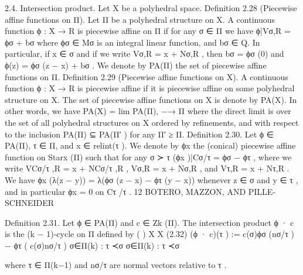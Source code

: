 \documentclass[
  11pt,
]{article}
\newenvironment{Shaded}{}{}
\newcommand{\NormalTok}[1]{#1}
\begin{document}
\begin{Shaded}
\begin{Highlighting}[]
\NormalTok{2.4. Intersection product. Let X be a polyhedral space.}
\NormalTok{Definition 2.28 (Piecewise affine functions on Π). Let Π be a polyhedral structure on X. A}
\NormalTok{continuous function ϕ : X → R is piecewise affine on Π if for any σ ∈ Π we have}
\NormalTok{                                           ϕ|Vσ,R = ϕσ + bσ}
\NormalTok{where ϕσ ∈ Mσ is an integral linear function, and bσ ∈ Q. In particular, if x ∈ σ and if we write}
\NormalTok{Vσ,R = x + Nσ,R , then bσ = ϕσ (0) and ϕ(z) = ϕσ (z − x) + bσ .}
\NormalTok{   We denote by PA(Π) the set of piecewise affine functions on Π.}
\NormalTok{Definition 2.29 (Piecewise affine functions on X). A continuous function ϕ : X → R is}
\NormalTok{piecewise affine if it is piecewise affine on some polyhedral structure on X. The set of piecewise}
\NormalTok{affine functions on X is denote by PA(X). In other words, we have}
\NormalTok{                                        PA(X) = lim PA(Π),}
\NormalTok{                                                −→}
\NormalTok{                                                   Π}
\NormalTok{where the direct limit is over the set of all polyhedral structures on X ordered by refinements, and}
\NormalTok{with respect to the inclusion PA(Π) ⊆ PA(Π′ ) for any Π′ ≥ Π.}
\NormalTok{Definition 2.30. Let ϕ ∈ PA(Π), τ ∈ Π, and x ∈ relint(τ ). We denote by ϕx the (conical)}
\NormalTok{piecewise affine function on Starx (Π) such that for any σ ≻ τ}
\NormalTok{                                        (ϕx )|Cσ/τ = ϕσ − ϕτ ,}
\NormalTok{where we write VCσ/τ ,R = x + NCσ/τ ,R , Vσ,R = x + Nσ,R , and Vτ,R = x + Nτ,R .}
\NormalTok{   We have ϕx (λ(z − y)) = λ(ϕσ (z − x) − ϕτ (y − x)) whenever z ∈ σ and y ∈ τ , and in particular}
\NormalTok{ϕx = 0 on Cτ /τ .}
\NormalTok{12                                         BOTERO, MAZZON, AND PILLE{-}SCHNEIDER}


\NormalTok{Definition 2.31. Let ϕ ∈ PA(Π) and c ∈ Zk (Π). The intersection product ϕ · c is the (k − 1){-}cycle}
\NormalTok{on Π defined by}
\NormalTok{                                                                                         (                               )}
\NormalTok{                                               X                                              X}
\NormalTok{(2.32)               (ϕ · c)(τ ) :=                         c(σ)ϕσ (nσ/τ ) − ϕτ (                            c(σ)nσ/τ )}
\NormalTok{                                          σ∈Π(k) : τ ≺σ                                   σ∈Π(k) : τ ≺σ}


\NormalTok{where τ ∈ Π(k−1) and nσ/τ are normal vectors relative to τ .}


\end{Highlighting}
\end{Shaded}
\end{document}
